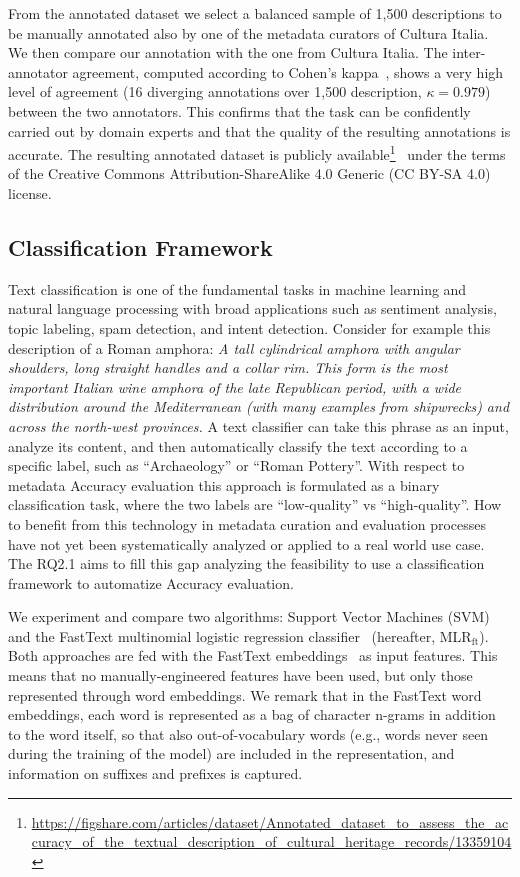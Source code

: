 \documentclass[epsfig,a4paper,12pt,titlepage]{book}
\newcommand{\mlr}{MLR$_\text{ft}$\xspace}
\begin{document}
From the annotated dataset we select a balanced sample of 1,500 descriptions to be manually annotated also by one of the metadata curators of Cultura Italia. 
We then compare our annotation with the one from Cultura Italia. The inter-annotator agreement, computed according to Cohen's kappa~\cite{iraa}, shows a very high level of agreement (16 diverging annotations over 1,500 description, $\kappa=0.979$) between the two annotators. This confirms that the task can be confidently carried out by domain experts and that the quality of the resulting annotations is accurate.
The resulting annotated dataset is publicly available\footnote{\url{https://figshare.com/articles/dataset/Annotated_dataset_to_assess_the_accuracy_of_the_textual_description_of_cultural_heritage_records/13359104}}~\cite{dataset} under the terms of the Creative Commons Attribution-ShareAlike 4.0 Generic (CC BY-SA 4.0) license.

\subsection{Classification Framework}
\label{sebsec:classframe}
Text classification is one of the fundamental tasks in machine learning and natural language processing with broad applications such as sentiment analysis, topic labeling, spam detection, and intent detection.  Consider for example this description of a Roman amphora: \textit{A tall cylindrical amphora with angular shoulders, long straight handles and a collar rim. This form is the most important Italian wine amphora of the late Republican period, with a wide distribution around the Mediterranean (with many examples from shipwrecks) and across the north-west provinces.} A text classifier can take this phrase as an input, analyze its content, and then automatically classify the text according to a specific label, such as ``Archaeology'' or ``Roman Pottery''.
With respect to metadata Accuracy evaluation this approach is formulated as a binary classification task, where the two labels are ``low-quality'' vs ``high-quality''. How to benefit from this technology in metadata curation and evaluation processes have not yet been systematically analyzed or applied to a real world use case.
The RQ2.1 aims to fill this gap analyzing the feasibility to use a classification framework to automatize Accuracy evaluation.

We experiment and compare two algorithms: Support Vector Machines (SVM)~\cite{10.1023/A:1022627411411} and the FastText multinomial logistic regression classifier~\cite{joulin-etal-2017-bag} (hereafter, \mlr). Both approaches are fed with the FastText embeddings~\cite{fast10} as input features. This means that no manually-engineer\-ed features have been used, but only those represented through word embeddings. We remark that in the FastText word embeddings, each word is represented as a bag of character n-grams in addition to the word itself, so that also out-of-vocabulary words (e.g., words never seen during the training of the model) are included in the representation, and information on suffixes and prefixes is captured.  
\end{document}
